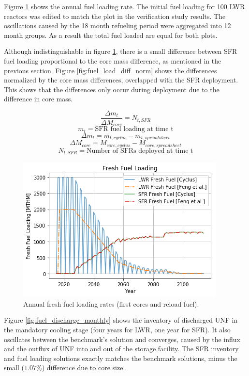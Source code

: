 Figure \ref{fig:fuel_load} shows the annual fuel loading rate.
The initial fuel loading for 100 \gls{LWR} reactors was edited to match
the plot in the verification
study results. The oscillations caused by the 18 month refueling period
were aggregated into 12 month groups. As a result the total fuel loaded
are equal for both plots.

Although indistinguishable in figure \ref{fig:fuel_load},
there is a small difference between \gls{SFR} fuel loading proportional
to the core mass difference, as mentioned in the previous section.
Figure \ref{fig:fuel_load_diff_norm} shows the
differences normalized by the core mass differences, overlapped with the
\gls{SFR} deployment. This shows that the differences only occur during
deployment due to the difference in core mass.

\[ \frac{\Delta m_t}{\Delta M_{core}} = N_{t, SFR} \]
\[ m_t = \text{SFR fuel loading at time t}  \]
\[ \Delta m_t = m_{t,cyclus} - m_{t,spreadsheet} \]
\[ \Delta M_{core} = M_{core, cyclus} - M_{core, spreadsheet} \]
\[ N_{t, SFR} = \text{Number of SFRs deployed at time t}\]

\begin{figure}[htbp!]
    \begin{center}
        \includegraphics[scale=0.5]{./images/results_18/fuel_load.png}
    \end{center}
        \caption{Annual fresh fuel loading rates (first cores and reload fuel).}
    \label{fig:fuel_load}
\end{figure}

Figure \ref{fig:fuel_discharge_monthly} shows the inventory of discharged
\gls{UNF} in the mandatory cooling stage (four years for \gls{LWR}, one year for \gls{SFR}).
It also oscillates between the benchmark's
solution and converges, caused by the influx and the outflux of \gls{UNF}
into and out of the storage facility.
The \gls{SFR} inventory and fuel loading
solutions exactly matches the benchmark solutions, minus the small ($1.07\%$) difference due to core
size.

